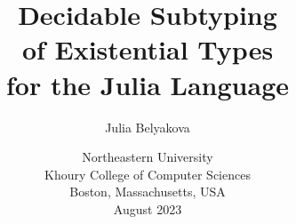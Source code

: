 \title{Decidable Subtyping\\ of Existential Types\\for the Julia Language}

\author{Julia Belyakova}

\date{\normalsize%
Northeastern University\\
Khoury College of Computer Sciences\\
Boston, Massachusetts, USA\\
August 2023
}

\maketitle


\begin{abstract}

\end{abstract}
